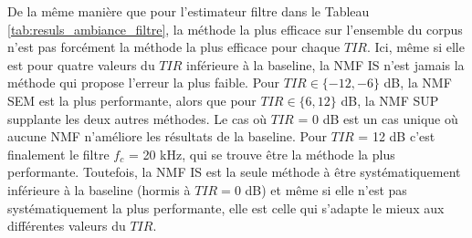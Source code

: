 \begin{table}[h]
\centering
\caption{Erreurs $MAE_{TIR}$ selon les combinaisons optimales de la NMF SUP, SEM et IS.}
\label{tab:mae_tir_ambiance}
\end{table}

De la même manière que pour l'estimateur filtre dans le Tableau \ref{tab:resuls_ambiance_filtre}, la méthode la plus efficace sur l'ensemble du corpus n'est pas forcément la méthode la plus efficace pour chaque $TIR$. Ici, même si elle est pour quatre valeurs du $TIR$ inférieure à la baseline, la NMF IS n'est jamais la méthode qui propose l'erreur la plus faible. Pour $TIR \in \lbrace -12, -6 \rbrace$ dB, la NMF SEM est la plus performante, alors que pour $TIR\in \lbrace 6, 12 \rbrace$ dB, la NMF SUP supplante les deux autres méthodes.
Le cas où $TIR$ = 0 dB est un cas unique où aucune NMF n'améliore les résultats de la baseline. Pour $TIR$ = 12 dB c'est finalement le filtre $f_c$ = 20 kHz, qui se trouve être la méthode la plus performante. Toutefois, la NMF IS est la seule méthode à être systématiquement inférieure à la baseline (hormis à $TIR = 0$ dB) et même si elle n'est pas systématiquement la plus performante, elle est celle qui s'adapte le mieux aux différentes valeurs du $TIR$.\\


